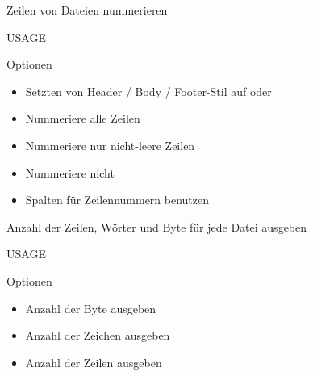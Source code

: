 \documentclass[aspectratio=43]{beamer}
\begin{document}
\begin{frame} 
	\begin{block}{} 
        Zeilen von Dateien nummerieren
	\end{block}
	\begin{block}{USAGE} 
	\end{block}
	\begin{exampleblock}{Optionen} 
	\begin{itemize}
	\item {} Setzten von Header / Body / Footer-Stil auf  oder 
	\item {} Nummeriere alle Zeilen
	\item {} Nummeriere nur nicht-leere Zeilen
	\item {} Nummeriere nicht
	\item {} Spalten für Zeilennummern benutzen
	
	\end{itemize}
	
	\end{exampleblock}
\end{frame}

\begin{frame} 
	\begin{block}{} 
         Anzahl der Zeilen, Wörter und Byte für jede Datei ausgeben
	\end{block}
	\begin{block}{USAGE} 
	\end{block}
	\begin{exampleblock}{Optionen} 
	\begin{itemize}
	\item {}  Anzahl der Byte ausgeben
	\item {} Anzahl der Zeichen ausgeben
	\item {} Anzahl der Zeilen ausgeben
	
	\end{itemize}
	
	\end{exampleblock}
\end{frame}
\end{document}
